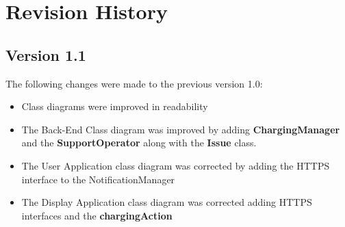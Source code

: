 \section{Revision History}
\subsection{Version 1.1}
The following changes were made to the previous version 1.0:
\begin{itemize}
\item Class diagrams were improved in readability
\item The Back-End Class diagram was improved by adding \textbf{ChargingManager} and the \textbf{SupportOperator} along with the \textbf{Issue} class.
\item The User Application class diagram was corrected by adding the HTTPS interface to the NotificationManager
\item The Display Application class diagram was corrected adding HTTPS interfaces and the \textbf{chargingAction}
\end{itemize}